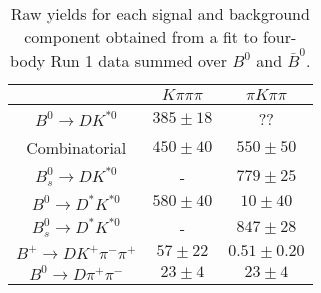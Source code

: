 \begin{table}
  \centering
  \begin{tabular}{ccc}
      \toprule
       & $K\pi\pi\pi$ & $\pi K\pi\pi$ \\
      \midrule
      $B^0 \to DK^{*0}$ & $385 \pm 18$ & ?? \\
      Combinatorial & $450 \pm 40$ & $550 \pm 50$ \\
      $B^0_s \to DK^{*0}$ & \-- & $779 \pm 25$ \\
      $B^0 \to D^*K^{*0}$ & $580 \pm 40$ & $10 \pm 40$ \\
      $B^0_s \to D^*K^{*0}$ & \-- & $847 \pm 28$ \\
      $B^+ \to DK^+\pi^-\pi^+$ & $57 \pm 22$ & $0.51 \pm 0.20$ \\
      $B^0 \to D\pi^+\pi^-$ & $23 \pm 4$ & $23 \pm 4$ \\
      \bottomrule
      \end{tabular}
  \caption{Raw yields for each signal and background component obtained from a fit to four-body Run 1 data summed over $B^0$ and $\bar{B}^0$.}
\label{tab:yields_combined_4body_run1}
\end{table}
